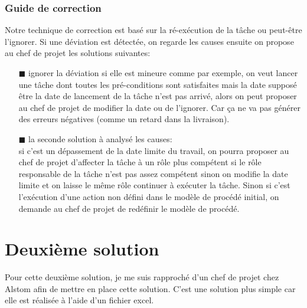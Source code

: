 \subsubsection*{Guide de correction}
Notre technique de correction est basé sur la ré-exécution de la tâche ou peut-être l'ignorer. Si une déviation est détectée, on regarde les causes ensuite on propose au chef de projet les solutions suivantes:\\
\begin{itemize}
\item[\tiny{$\blacksquare$}] ignorer la déviation si elle est mineure comme par exemple, on veut lancer une tâche dont toutes les pré-conditions sont satisfaites mais la date supposé être la date de lancement de la tâche n'est pas arrivé, alors on peut proposer au chef de projet de modifier la date ou de l'ignorer. Car ça ne va pas générer des erreurs négatives (comme un retard dans la livraison).
\item[\tiny{$\blacksquare$}] la seconde solution à analysé les causes:\\
si c'est un dépassement de la date limite du travail, on pourra proposer au chef de projet d'affecter la tâche à un rôle plus compétent si le rôle responsable de la tâche n'est pas assez compétent sinon on modifie la date limite et on laisse le même rôle continuer à exécuter la tâche. Sinon si c'est l'exécution d'une action non défini dans le modèle de procédé initial, on demande au chef de projet de redéfinir le modèle de procédé.
\end{itemize}
\section{Deuxième solution}
Pour cette deuxième solution, je me suis rapproché d'un chef de projet chez \og Alstom \fg{} afin de mettre en place cette solution. C'est une solution plus simple car elle est réalisée à l'aide d'un fichier excel.
